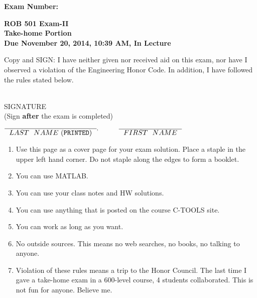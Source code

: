 \documentclass[letterpaper]{article}
\newcommand{\bline}[1]{\underline{\hspace*{#1}}}
\begin{document}


\begin{flushright}
{\bf Exam Number:}\bline{0.6in}
\end{flushright}

\vspace*{.1in}
\begin{center}
\LARGE \bf
ROB 501 Exam-II \\
Take-home Portion \\
\large
Due November 20, 2014, 10:39 AM, In Lecture
\end{center}

\vspace*{1in}

 Copy and SIGN: I have neither given nor received aid on this exam, nor have I observed a violation of the
Engineering Honor Code. In addition, I have followed the rules stated below.

\vspace*{1in}
\begin{flushright}
\underline{\hspace*{2.5in}} \\
SIGNATURE \\
(Sign {\bf after} the exam is completed)
\end{flushright}

\vspace*{1in}

\begin{center}
$\overline{\mathrm ~~LAST~~NAME~ ({\tt PRINTED})~~}^, \hspace*{.4in} \overline{\mathrm ~~FIRST~~NAME~~}$ \\

\end{center}

\vspace*{.45in} 
\begin{enumerate}
\item Use this page as a cover page for your exam solution. Place a staple in the upper left hand corner. Do not staple along the edges to form a booklet.
\item You can use MATLAB.
\item You can use your class notes and HW solutions.
 \item You can use anything that is posted on the course C-TOOLS site.
 \item You can work as long as you want.
 \item No outside sources. This means no web searches, no books, no talking to anyone.
 \item Violation of these rules means a trip to the Honor Council. The last time I gave a take-home exam in a 600-level course, 4 students collaborated. This is not fun for anyone. Believe me.
\end{enumerate}
\vspace*{.4in}
\end{document}
